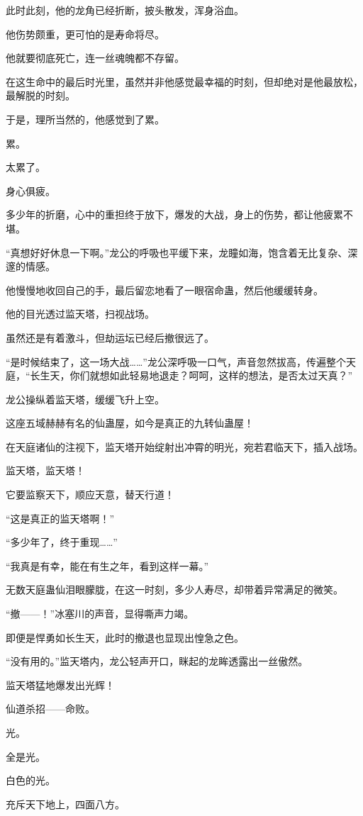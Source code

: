 \begin{this_body}
此时此刻，他的龙角已经折断，披头散发，浑身浴血。

他伤势颇重，更可怕的是寿命将尽。

他就要彻底死亡，连一丝魂魄都不存留。

在这生命中的最后时光里，虽然并非他感觉最幸福的时刻，但却绝对是他最放松，最解脱的时刻。

于是，理所当然的，他感觉到了累。

累。

太累了。

身心俱疲。

多少年的折磨，心中的重担终于放下，爆发的大战，身上的伤势，都让他疲累不堪。

“真想好好休息一下啊。”龙公的呼吸也平缓下来，龙瞳如海，饱含着无比复杂、深邃的情感。

他慢慢地收回自己的手，最后留恋地看了一眼宿命蛊，然后他缓缓转身。

他的目光透过监天塔，扫视战场。

虽然还是有着激斗，但劫运坛已经后撤很远了。

“是时候结束了，这一场大战……”龙公深呼吸一口气，声音忽然拔高，传遍整个天庭，“长生天，你们就想如此轻易地退走？呵呵，这样的想法，是否太过天真？”

龙公操纵着监天塔，缓缓飞升上空。

这座五域赫赫有名的仙蛊屋，如今是真正的九转仙蛊屋！

在天庭诸仙的注视下，监天塔开始绽射出冲霄的明光，宛若君临天下，插入战场。

监天塔，监天塔！

它要监察天下，顺应天意，替天行道！

“这是真正的监天塔啊！”

“多少年了，终于重现……”

“我真是有幸，能在有生之年，看到这样一幕。”

无数天庭蛊仙泪眼朦胧，在这一时刻，多少人寿尽，却带着异常满足的微笑。

“撤——！”冰塞川的声音，显得嘶声力竭。

即便是悍勇如长生天，此时的撤退也显现出惶急之色。

“没有用的。”监天塔内，龙公轻声开口，眯起的龙眸透露出一丝傲然。

监天塔猛地爆发出光辉！

仙道杀招——命败。

光。

全是光。

白色的光。

充斥天下地上，四面八方。


\end{this_body}
